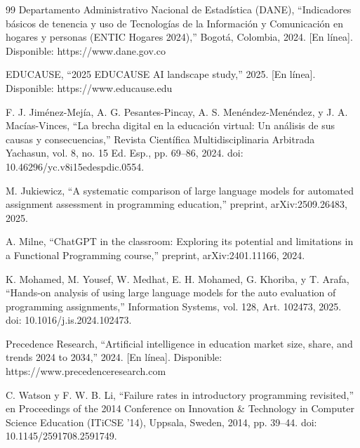 \documentclass[letterpaper, 10 pt, conference]{ieeeconf}  %
\begin{document}
\begin{thebibliography}{99}
 Departamento Administrativo Nacional de Estadística (DANE), “Indicadores básicos de tenencia y uso de Tecnologías de la Información y Comunicación en hogares y personas (ENTIC Hogares 2024),” Bogotá, Colombia, 2024. [En línea]. Disponible: https://www.dane.gov.co

 EDUCAUSE, “2025 EDUCAUSE AI landscape study,” 2025. [En línea]. Disponible: https://www.educause.edu

 F. J. Jiménez-Mejía, A. G. Pesantes-Pincay, A. S. Menéndez-Menéndez, y J. A. Macías-Vinces, “La brecha digital en la educación virtual: Un análisis de sus causas y consecuencias,” Revista Científica Multidisciplinaria Arbitrada Yachasun, vol. 8, no. 15 Ed. Esp., pp. 69–86, 2024. doi: 10.46296/yc.v8i15edespdic.0554.

 M. Jukiewicz, “A systematic comparison of large language models for automated assignment assessment in programming education,” preprint, arXiv:2509.26483, 2025.

 A. Milne, “ChatGPT in the classroom: Exploring its potential and limitations in a Functional Programming course,” preprint, arXiv:2401.11166, 2024.

 K. Mohamed, M. Yousef, W. Medhat, E. H. Mohamed, G. Khoriba, y T. Arafa, “Hands-on analysis of using large language models for the auto evaluation of programming assignments,” Information Systems, vol. 128, Art. 102473, 2025. doi: 10.1016/j.is.2024.102473.

 Precedence Research, “Artificial intelligence in education market size, share, and trends 2024 to 2034,” 2024. [En línea]. Disponible: https://www.precedenceresearch.com

 C. Watson y F. W. B. Li, “Failure rates in introductory programming revisited,” en Proceedings of the 2014 Conference on Innovation \& Technology in Computer Science Education (ITiCSE '14), Uppsala, Sweden, 2014, pp. 39–44. doi: 10.1145/2591708.2591749.

\end{thebibliography}
\end{document}
